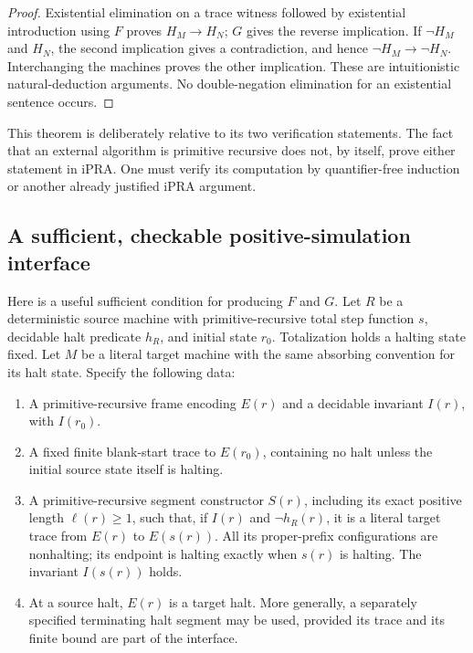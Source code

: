 \begin{proof}
Existential elimination on a trace witness followed by existential
introduction using $F$ proves $H_M\to H_N$; $G$ gives the reverse implication.
If $\neg H_M$ and $H_N$, the second implication gives a contradiction,
and hence $\neg H_M\to\neg H_N$. Interchanging the machines proves the
other implication. These are intuitionistic natural-deduction arguments.
No double-negation elimination for an existential sentence occurs.
\end{proof}

This theorem is deliberately relative to its two verification statements.
The fact that an external algorithm is primitive recursive does not, by
itself, prove either statement in iPRA. One must verify its computation by
quantifier-free induction or another already justified iPRA argument.

\subsection{A sufficient, checkable positive-simulation interface}

Here is a useful sufficient condition for producing $F$ and $G$. Let $R$ be
a deterministic source machine with primitive-recursive total step function
$s$, decidable halt predicate $h_R$, and initial state $r_0$. Totalization
holds a halting state fixed. Let $M$ be a literal target machine with the
same absorbing convention for its halt state. Specify the following data:

\begin{enumerate}
\item A primitive-recursive frame encoding $E(r)$ and a decidable invariant
      $I(r)$, with $I(r_0)$.
\item A fixed finite blank-start trace to $E(r_0)$, containing no halt unless
      the initial source state itself is halting.
\item A primitive-recursive segment constructor $S(r)$, including its
      exact positive length $\ell(r)\ge1$, such that, if $I(r)$ and
      $\neg h_R(r)$, it is a literal target trace from $E(r)$ to $E(s(r))$.
      All its proper-prefix configurations are nonhalting; its endpoint is
      halting exactly when $s(r)$ is halting. The invariant $I(s(r))$ holds.
\item At a source halt, $E(r)$ is a target halt. More generally, a separately
      specified terminating halt segment may be used, provided its trace
      and its finite bound are part of the interface.
\end{enumerate}

